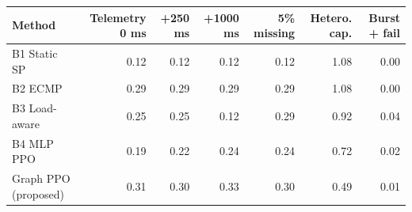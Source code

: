 \begin{tabular}{lrrrrrr}
\toprule
Method & Telemetry 0 ms & +250 ms & +1000 ms & 5\% missing & Hetero. cap. & Burst + fail \\
\midrule
B1 Static SP & 0.12 & 0.12 & 0.12 & 0.12 & 1.08 & 0.00 \\
B2 ECMP & 0.29 & 0.29 & 0.29 & 0.29 & 1.08 & 0.00 \\
B3 Load-aware & 0.25 & 0.25 & 0.12 & 0.29 & 0.92 & 0.04 \\
B4 MLP PPO & 0.19 & 0.22 & 0.24 & 0.24 & 0.72 & 0.02 \\
Graph PPO (proposed) & 0.31 & 0.30 & 0.33 & 0.30 & 0.49 & 0.01 \\
\bottomrule
\end{tabular}
